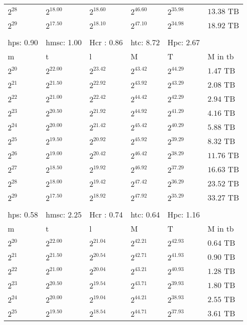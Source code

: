 \begin{tabular}{llllll}
$2^{28}$ & $2^{18.00}$ & $2^{18.60}$ & $2^{46.60}$ & $2^{35.98}$ & $13.38$ TB \\
$2^{29}$ & $2^{17.50}$ & $2^{18.10}$ & $2^{47.10}$ & $2^{34.98}$ & $18.92$ TB \\
 &  &  &  &  &  \\
hps: 0.90 & hmsc: 1.00 & Hcr : 0.86 & htc: 8.72 & Hpc: 2.67 &  \\
m & t & l & M & T & M in tb \\
$2^{20}$ & $2^{22.00}$ & $2^{23.42}$ & $2^{43.42}$ & $2^{44.29}$ & $1.47$ TB \\
$2^{21}$ & $2^{21.50}$ & $2^{22.92}$ & $2^{43.92}$ & $2^{43.29}$ & $2.08$ TB \\
$2^{22}$ & $2^{21.00}$ & $2^{22.42}$ & $2^{44.42}$ & $2^{42.29}$ & $2.94$ TB \\
$2^{23}$ & $2^{20.50}$ & $2^{21.92}$ & $2^{44.92}$ & $2^{41.29}$ & $4.16$ TB \\
$2^{24}$ & $2^{20.00}$ & $2^{21.42}$ & $2^{45.42}$ & $2^{40.29}$ & $5.88$ TB \\
$2^{25}$ & $2^{19.50}$ & $2^{20.92}$ & $2^{45.92}$ & $2^{39.29}$ & $8.32$ TB \\
$2^{26}$ & $2^{19.00}$ & $2^{20.42}$ & $2^{46.42}$ & $2^{38.29}$ & $11.76$ TB \\
$2^{27}$ & $2^{18.50}$ & $2^{19.92}$ & $2^{46.92}$ & $2^{37.29}$ & $16.63$ TB \\
$2^{28}$ & $2^{18.00}$ & $2^{19.42}$ & $2^{47.42}$ & $2^{36.29}$ & $23.52$ TB \\
$2^{29}$ & $2^{17.50}$ & $2^{18.92}$ & $2^{47.92}$ & $2^{35.29}$ & $33.27$ TB \\
 &  &  &  &  &  \\
hps: 0.58 & hmsc: 2.25 & Hcr : 0.74 & htc: 0.64 & Hpc: 1.16 &  \\
m & t & l & M & T & M in tb \\
$2^{20}$ & $2^{22.00}$ & $2^{21.04}$ & $2^{42.21}$ & $2^{42.93}$ & $0.64$ TB \\
$2^{21}$ & $2^{21.50}$ & $2^{20.54}$ & $2^{42.71}$ & $2^{41.93}$ & $0.90$ TB \\
$2^{22}$ & $2^{21.00}$ & $2^{20.04}$ & $2^{43.21}$ & $2^{40.93}$ & $1.28$ TB \\
$2^{23}$ & $2^{20.50}$ & $2^{19.54}$ & $2^{43.71}$ & $2^{39.93}$ & $1.80$ TB \\
$2^{24}$ & $2^{20.00}$ & $2^{19.04}$ & $2^{44.21}$ & $2^{38.93}$ & $2.55$ TB \\
$2^{25}$ & $2^{19.50}$ & $2^{18.54}$ & $2^{44.71}$ & $2^{37.93}$ & $3.61$ TB \\

\end{tabular}
